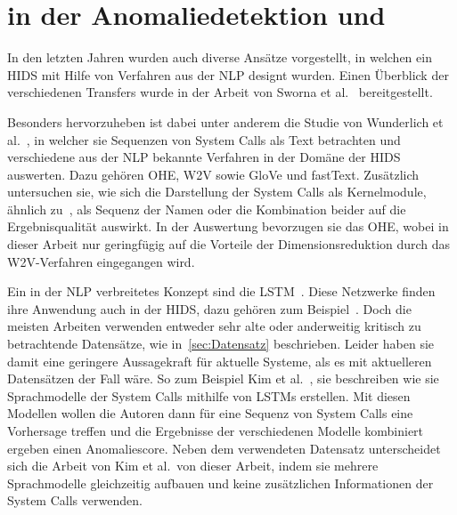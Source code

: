     \section{ in der Anomalie\-detektion und }\label{sec:related_nlp}

        In den letzten Jahren wurden auch diverse Ansätze vorgestellt, in welchen ein \ac{HIDS} mit Hilfe von Verfahren aus der \ac{NLP} designt wurden.
        Einen Überblick der verschiedenen Transfers wurde in der Arbeit von Sworna et al.~\cite{NLPHIDSSWORNA2022} bereitgestellt.\par\medskip

        Besonders hervorzuheben ist dabei unter anderem die Studie von Wunderlich et al.~\cite{W2VWUNDERLICH2019}, in welcher sie Sequenzen von System Calls als Text betrachten und verschiedene aus der \ac{NLP} bekannte Verfahren in der Domäne der \ac{HIDS} auswerten.
        Dazu gehören \ac{OHE}, \ac{W2V} sowie GloVe und fastText. 
        Zusätzlich untersuchen sie, wie sich die Darstellung der System Calls als Kernelmodule, ähnlich zu~\cite{SYSTEM_STATES}, als Sequenz der Namen oder die Kombination beider auf die Ergebnisqualität auswirkt.
        In der Auswertung bevorzugen sie das \ac{OHE}, wobei in dieser Arbeit nur geringfügig auf die Vorteile der Dimensionsreduktion durch das \ac{W2V}-Verfahren eingegangen wird.\par\medskip

        Ein in der \ac{NLP} verbreitetes Konzept sind die \ac{LSTM}~\cite{LSTMNLP2016,LSTMREVIEWYU2019}.
        Diese Netzwerke finden ihre Anwendung auch in der \ac{HIDS}, dazu gehören zum Beispiel~\cite{LSTMsys, LSTMPARK2021, LSTMSURATKAR2019, NIU2020, BIDIRECTIONALLSTMCHAWLA2019, VARIATIONALLSTMBOUZAR2019}.
        Doch die meisten Arbeiten verwenden entweder sehr alte oder anderweitig kritisch zu betrachtende Datensätze, wie in~\autoref{sec:Datensatz} beschrieben.
        Leider haben sie damit eine geringere Aussagekraft für aktuelle Systeme, als es mit aktuelleren Datensätzen der Fall wäre.
        So zum Beispiel Kim et al.~\cite{LSTMsys}, sie beschreiben wie sie Sprachmodelle der System Calls mithilfe von \acp{LSTM} erstellen.
        Mit diesen Modellen wollen die Autoren dann für eine Sequenz von System Calls eine Vorhersage treffen und die Ergebnisse der verschiedenen Modelle kombiniert ergeben einen Anomaliescore.
        Neben dem verwendeten Datensatz unterscheidet sich die Arbeit von Kim et al.\ von dieser Arbeit, indem sie mehrere Sprachmodelle gleichzeitig aufbauen und keine zusätzlichen Informationen der System Calls verwenden.\par\medskip

